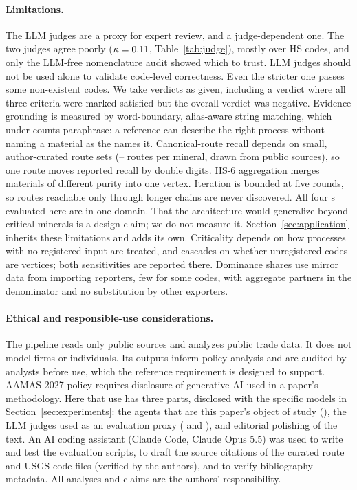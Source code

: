 \paragraph{Limitations.}
The LLM judges are a proxy for expert review, and a judge-dependent one. The two judges agree poorly ($\kappa=0.11{}$, Table~\ref{tab:judge}), mostly over HS codes, and only the LLM-free nomenclature audit showed which to trust. LLM judges should not be used alone to validate code-level correctness. Even the stricter one passes some non-existent codes. We take verdicts as given, including a \JudgeAName{} verdict where all three criteria were marked satisfied but the overall verdict was negative. Evidence grounding is measured by word-boundary, alias-aware string matching, which under-counts paraphrase: a reference can describe the right process without naming a material as the \tool{} names it. Canonical-route recall depends on small, author-curated route sets (\RoutesNMin{}--\RoutesNMax{} routes per mineral, drawn from public sources), so one route moves reported recall by double digits. HS-6 aggregation merges materials of different purity into one vertex. Iteration is bounded at five rounds, so routes reachable only through longer chains are never discovered. All four \tool{}s evaluated here are in one domain. That the architecture would generalize beyond critical minerals is a design claim; we do not measure it. Section~\ref{sec:application} inherits these limitations and adds its own. Criticality depends on how processes with no registered input are treated, and cascades on whether unregistered codes are vertices; both sensitivities are reported there. Dominance shares use mirror data from \DisruptReporters{} importing reporters, few for some codes, with aggregate partners in the denominator and no substitution by other exporters.

\paragraph{Ethical and responsible-use considerations.}
The pipeline reads only public sources and analyzes public trade data. It does not model firms or individuals. Its outputs inform policy analysis and are audited by analysts before use, which the reference requirement is designed to support. AAMAS 2027 policy requires disclosure of generative AI used in a paper's methodology. Here that use has three parts, disclosed with the specific models in Section~\ref{sec:experiments}: the agents that are this paper's object of study (\GenModel{}), the LLM judges used as an evaluation proxy (\JudgeAName{} and \JudgeBName{}), and editorial polishing of the text. An AI coding assistant (Claude Code, Claude Opus 5.5) was used to write and test the evaluation scripts, to draft the source citations of the curated route and USGS-code files (verified by the authors), and to verify bibliography metadata. All analyses and claims are the authors' responsibility.

